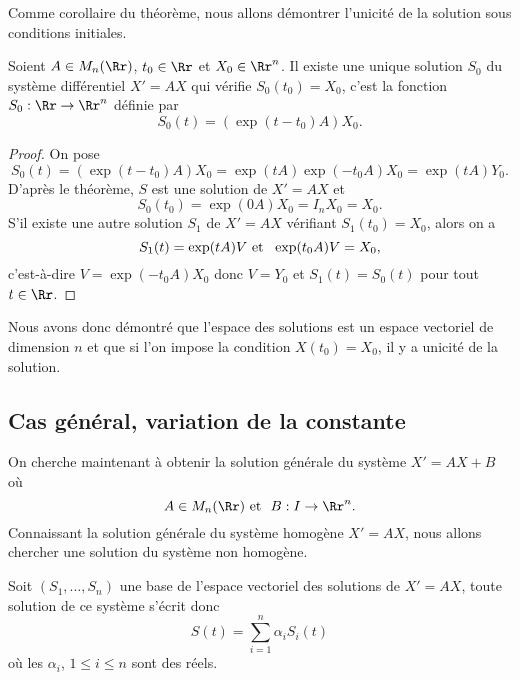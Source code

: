 \documentclass[class=report,crop=false]{standalone}
\begin{document}
Comme corollaire du théorème, nous allons démontrer l'unicité de 
la solution sous conditions initiales.

\begin{proposition}
Soient $A\in M_n(\Rr)$, $t_0\in\Rr$ et $X_0\in\Rr^n$. 
Il existe une unique solution $S_0$ du système 
différentiel $X'=AX$ qui vérifie $S_0(t_0)=X_0$, c'est la 
fonction $S_0:\Rr\rightarrow\Rr^n$ définie par 
$$S_0(t)=(\exp(t-t_0)A)X_0.$$
\end{proposition}  

\begin{proof}
On pose 
$$S_0(t)=(\exp(t-t_0)A)X_0=\exp(tA)\exp(-t_0A)X_0=\exp(tA)Y_0.$$
D'après le théorème, $S$ est une solution de $X'=AX$ et $$S_0(t_0)=\exp(0A)X_0=I_nX_0=X_0.$$ 
S'il existe une autre solution $S_1$ de $X'=AX$ vérifiant $S_1(t_0)=X_0$, 
alors on a $$S_1(t)=\exp(tA)V\ {\hbox{et}}\ \  \exp(t_0A)V=X_0,$$ c'est-à-dire 
$V=\exp(-t_0A)X_0$ donc $V=Y_0$ et $S_1(t)=S_0(t)$ pour tout $t\in \Rr$.
\end{proof}


Nous avons donc démontré que l'espace des solutions est un 
espace vectoriel de dimension $n$ et que si l'on impose la condition 
$X(t_0)=X_0$, il y a unicité de la solution.


\subsection{Cas général, variation de la constante}

On cherche maintenant à obtenir la solution générale du système 
$X'=AX+B$ où $$A\in M_n(\Rr)\ {\hbox{et}}\ \  
B:I\rightarrow \Rr^n.$$
Connaissant la solution générale du système homogène $X'=AX$, 
nous allons chercher une solution du système non homogène.

Soit $(S_1,\ldots,S_n)$ une base de l'espace vectoriel des solutions de 
$X'=AX$, toute solution de ce système s'écrit donc 
$$S(t)=\sum_{i=1}^{n}\alpha_iS_i(t)$$
où les $\alpha_i$, $1\leq i\leq n$ sont des réels. 
\end{document}
